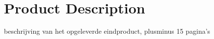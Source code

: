 \section{Product Description}

beschrijving van het opgeleverde eindproduct, plusminus 15 pagina’s

